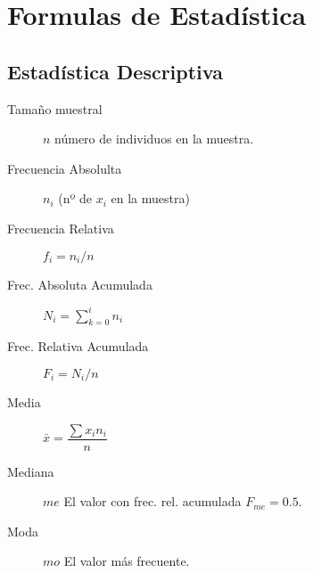 
\sloppy

\section*{Formulas de Estadística}

\footnotesize
{}

\begin{multicols*}{2}

\subsection*{Estadística Descriptiva}

\begin{tcolorbox}[hbox, title=Frecuencias]
\begin{minipage}{0.4\textwidth}
\begin{description}
\item [Tamaño muestral] $n$ número de individuos en la muestra.
\end{description}
\begin{description}
\item [Frecuencia Absolulta] $n_i$ (nº de $x_i$ en la muestra)
\item [Frecuencia Relativa] $f_i=n_i/n$
\item [Frec. Absoluta Acumulada] $N_i=\sum_{k=0}^in_i$
\item [Frec. Relativa Acumulada] $F_i=N_i/n$
\end{description}
\end{minipage}
\end{tcolorbox}

\begin{tcolorbox}[hbox, title=Estadísticos de tendencia central]
\begin{minipage}{0.4\textwidth}
\begin{description}
\item [Media] $\bar{x}=\dfrac{\sum x_in_i}{n}$
\item [Mediana] $me$ El valor con frec. rel. acumulada $F_{me}=0.5$.
\item [Moda] $mo$ El valor más frecuente.
\end{description}
\end{minipage}
\end{tcolorbox}


\end{multicols*}
